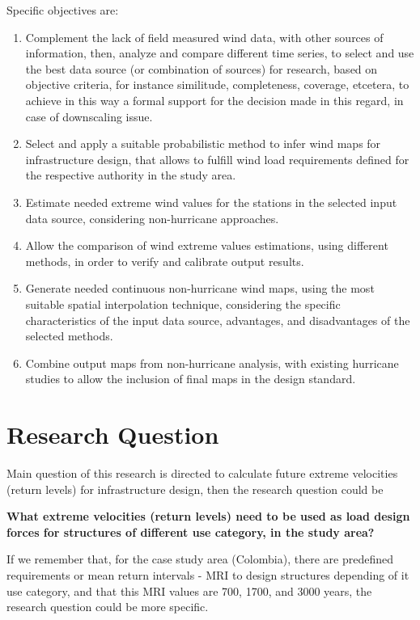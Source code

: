 \documentclass[12pt,oneside]{reedthesis}
\begin{document}
Specific objectives are:
\begin{enumerate}
\def\labelenumi{\arabic{enumi}.}
\item
  Complement the lack of field measured wind data, with other sources of information, then, analyze and compare different time series, to select and use the best data source (or combination of sources) for research, based on objective criteria, for instance similitude, completeness, coverage, etcetera, to achieve in this way a formal support for the decision made in this regard, in case of downscaling issue.
\item
  Select and apply a suitable probabilistic method to infer wind maps for infrastructure design, that allows to fulfill wind load requirements defined for the respective authority in the study area.
\item
  Estimate needed extreme wind values for the stations in the selected input data source, considering non-hurricane approaches.
\item
  Allow the comparison of wind extreme values estimations, using different methods, in order to verify and calibrate output results.
\item
  Generate needed continuous non-hurricane wind maps, using the most suitable spatial interpolation technique, considering the specific characteristics of the input data source, advantages, and disadvantages of the selected methods.
\item
  Combine output maps from non-hurricane analysis, with existing hurricane studies to allow the inclusion of final maps in the design standard.
\end{enumerate}
\hypertarget{research-question}{%
\section{Research Question}\label{research-question}}

Main question of this research is directed to calculate future extreme velocities (return levels) for infrastructure design, then the research question could be

\textbf{What extreme velocities (return levels) need to be used as load design forces for structures of different use category, in the study area?}

If we remember that, for the case study area (Colombia), there are predefined requirements or mean return intervals - MRI to design structures depending of it use category, and that this MRI values are 700, 1700, and 3000 years, the research question could be more specific.
\end{document}

